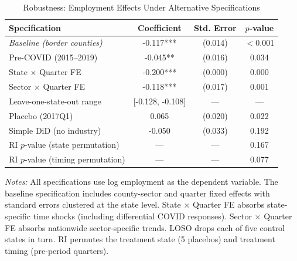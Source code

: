 \begin{table}[htbp]
\centering
\caption{Robustness: Employment Effects Under Alternative Specifications}
\label{tab:robust}
\begin{tabular}{lccc}
\toprule
Specification & Coefficient & Std. Error & $p$-value \\
\midrule
\textit{Baseline (border counties)} & -0.117*** & (0.014) & $<$0.001 \\
Pre-COVID (2015--2019) & -0.045** & (0.016) & 0.034 \\
State $\times$ Quarter FE & -0.200*** & (0.000) & 0.000 \\
Sector $\times$ Quarter FE & -0.118*** & (0.017) & 0.001 \\
Leave-one-state-out range & [-0.128, -0.108] & --- & --- \\
Placebo (2017Q1) & 0.065 & (0.020) & 0.022 \\
Simple DiD (no industry) & -0.050 & (0.033) & 0.192 \\
RI $p$-value (state permutation) & --- & --- & 0.167 \\
RI $p$-value (timing permutation) & --- & --- & 0.077 \\
\bottomrule
\end{tabular}
\begin{tablenotes}[flushleft]
\small
\item \textit{Notes:} All specifications use log employment as the dependent variable. The baseline specification includes county-sector and quarter fixed effects with standard errors clustered at the state level. State $\times$ Quarter FE absorbs state-specific time shocks (including differential COVID responses). Sector $\times$ Quarter FE absorbs nationwide sector-specific trends. LOSO drops each of five control states in turn. RI permutes the treatment state (5 placebos) and treatment timing (pre-period quarters).
\end{tablenotes}
\end{table}
